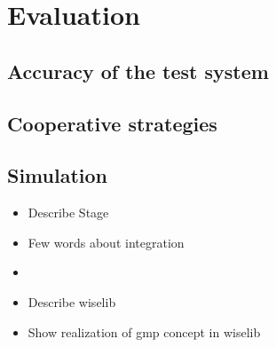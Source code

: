 \chapter{Evaluation}

\section{Accuracy of the test system}

\section{Cooperative strategies}

\section{Simulation} %

\begin{itemize}
  \item Describe Stage
  \item Few words about integration
  \item 
\end{itemize}

\begin{itemize}
  \item Describe wiselib
  \item Show realization of gmp concept in wiselib
\end{itemize}

